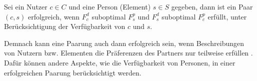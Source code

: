 \begin{definition}\label{def:2}
    Sei ein Nutzer $c \in C$ und eine Person (Element) $s \in S$ gegeben, dann ist ein Paar $(c,s)$ erfolgreich, wenn $F_{c}^{d}$ suboptimal $F_{s}^{p}$ und $F_{s}^{d}$ suboptimal $F_{c}^{p}$ erfüllt, unter Berücksichtigung der Verfügbarkeit von $c$ und $s$.
\end{definition}

Demnach kann eine Paarung auch dann erfolgreich sein, wenn Beschreibungen von Nutzern bzw. Elementen die Präferenzen des Partners nur teilweise erfüllen \cite[S. 37]{li:inproceedings}.
Dafür können andere Aspekte, wie die Verfügbarkeit von Personen, in einer erfolgreichen Paarung berücksichtigt werden.

